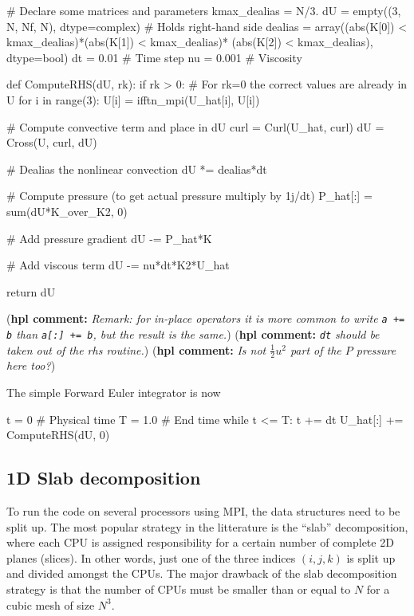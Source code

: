 \documentclass[11pt, oneside]{article}
\newcommand{\hpl}[1]{({\bf hpl comment:} \emph{#1})}
\begin{document}
\begin{python}
# Declare some matrices and parameters
kmax_dealias = N/3.
dU = empty((3, N, Nf, N), dtype=complex)  # Holds right-hand side
dealias = array((abs(K[0]) < kmax_dealias)*(abs(K[1]) < kmax_dealias)*
                (abs(K[2]) < kmax_dealias), dtype=bool)
dt = 0.01    # Time step
nu = 0.001   # Viscosity

def ComputeRHS(dU, rk):
    if rk > 0: # For rk=0 the correct values are already in U
        for i in range(3):
            U[i] = ifftn_mpi(U_hat[i], U[i])

    # Compute convective term and place in dU
    curl = Curl(U_hat, curl)
    dU = Cross(U, curl, dU)

    # Dealias the nonlinear convection
    dU *= dealias*dt

    # Compute pressure (to get actual pressure multiply by 1j/dt)
    P_hat[:] = sum(dU*K_over_K2, 0)

    # Add pressure gradient
    dU -= P_hat*K

    # Add viscous term
    dU -= nu*dt*K2*U_hat

    return dU
\end{python}
\hpl{Remark: for in-place operators it is more common to write \texttt{a += b} than \texttt{a[:] += b}, but the result is the same.}
\hpl{\texttt{dt} should be taken out of the rhs routine.}
\hpl{Is not $\frac{1}{2}u^2$ part of the $P$ pressure here too?}

The simple Forward Euler integrator is now
\begin{python}
t = 0        # Physical time
T = 1.0      # End time
while t <= T:
    t += dt
    U_hat[:] += ComputeRHS(dU, 0)
\end{python}

\subsection{1D Slab decomposition}
\label{slab1D}

To run the code on several processors using MPI, the data structures need to be split up. The most popular strategy in the litterature is the ``slab'' decomposition, where each CPU is assigned responsibility for a certain number of complete 2D planes (slices). In other words, just one of the three indices $(i,j,k)$ is split up and divided amongst the CPUs. The major drawback of the slab decomposition strategy is that the number of CPUs must be smaller than or equal to $N$ for a cubic mesh of size $N^3$.
\end{document}
